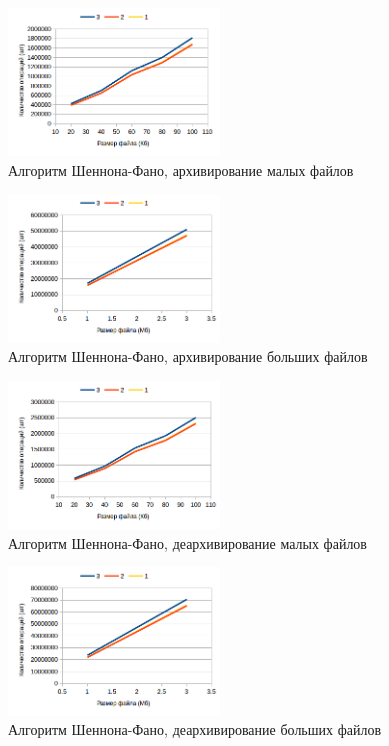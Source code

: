 \documentclass[a4paper,12pt]{article} %
\begin{document}
    \begin{figure}[!htb]
        \caption{Алгоритм Шеннона-Фано, архивирование малых файлов}
        \centering
        \includegraphics[width=0.5\textwidth]{graphs/1/sc_kb}
    \end{figure}
    \begin{figure}[!htb]
        \caption{Алгоритм Шеннона-Фано, архивирование больших файлов}
        \centering
        \includegraphics[width=0.5\textwidth]{graphs/1/sc_mb}
    \end{figure}
    \begin{figure}[!htb]
        \caption{Алгоритм Шеннона-Фано, деархивирование малых файлов}
        \centering
        \includegraphics[width=0.5\textwidth]{graphs/1/sd_kb}
    \end{figure}
    \begin{figure}[!htb]
        \caption{Алгоритм Шеннона-Фано, деархивирование больших файлов}
        \centering
        \includegraphics[width=0.5\textwidth]{graphs/1/sd_mb}
    \end{figure}
\end{document}
